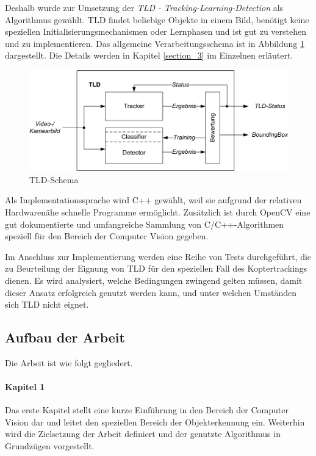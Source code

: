 Deshalb wurde zur Umsetzung der \textit{TLD - Tracking-Learning-Detection} \cite{TLD} als Algorithmus gewählt. TLD findet beliebige Objekte in einem Bild, benötigt keine speziellen Initialisierungsmechanismen oder Lernphasen und ist gut zu verstehen und zu implementieren. Das allgemeine Verarbeitungsschema ist in Abbildung \ref{TLD-Schema} dargestellt. Die Details werden in Kapitel \ref{section_3} im Einzelnen erläutert.

\begin{figure}
\centering{}\includegraphics[scale=0.75]{../pictures/TLD-Framework.jpg}\caption{TLD-Schema}
\label{TLD-Schema}
\end{figure}

Als Implementationssprache wird C++ gewählt, weil sie aufgrund der relativen Hardwarenähe schnelle Programme ermöglicht. Zusätzlich ist durch OpenCV \cite{OCV} eine gut dokumentierte und umfangreiche Sammlung von C/C++-Algorithmen speziell für den Bereich der Computer Vision gegeben.

Im Anschluss zur Implementierung werden eine Reihe von Tests durchgeführt, die zu Beurteilung der Eignung von TLD für den speziellen Fall des Koptertrackings dienen. Es wird analysiert, welche Bedingungen zwingend gelten müssen, damit dieser Ansatz erfolgreich genutzt werden kann, und unter welchen Umständen sich TLD nicht eignet.

\subsection{Aufbau der Arbeit}
Die Arbeit ist wie folgt gegliedert.

\paragraph{Kapitel 1}
  Das erste Kapitel stellt eine kurze Einführung in den Bereich der Computer Vision dar und leitet den speziellen Bereich der Objekterkennung ein. Weiterhin wird die Zielsetzung der Arbeit definiert und der genutzte Algorithmus in Grundzügen vorgestellt.

